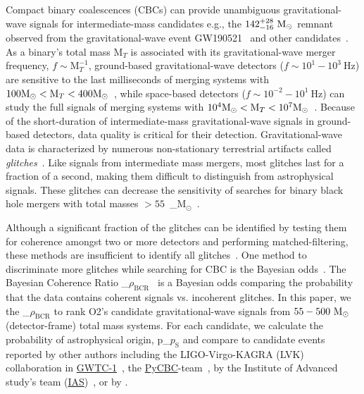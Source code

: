 \documentclass[%
 nofootinbib,
 amsmath,amssymb,
 aps,
 twocolumn,
 superscriptaddress
]{revtex4-2}
\newcommand{\pycbc}{{\sc \href{https://pycbc.org/}{{PyCBC}}}\xspace}
\newcommand{\GWTC}{{\sc \href{https://ui.adsabs.harvard.edu/abs/2019PhRvX...9c1040A/abstract}{{GWTC-1}}}\xspace}
\newcommand{\IAS}{{\sc \href{https://ui.adsabs.harvard.edu/abs/2020PhRvD.101h3030V/abstract}{{IAS}}}\xspace}
\newcommand{\fancytext}[1]{{\relax\ifmmode#1\else $#1$\fi}\xspace}
\newcommand{\mathcmd}[1]{{\sc \relax\ifmmode#1\else $#1$\fi}\xspace}
\newcommand{\bcr}{\mathcmd{\rho_\text{BCR}}}
\newcommand{\msun}{\mathcmd{\text{M}_\odot}}
\newcommand{\pastrobcr}{\fancytext{p_\text{S}}}
\begin{document}
Compact binary coalescences (CBCs) can provide unambiguous gravitational-wave signals for intermediate-mass candidates e.g., the $142^{+28}_{-16}\ \msun$ remnant observed from the gravitational-wave event GW190521~\cite{Abbott:2020:PhRvL} and other candidates~\cite{ligo_imbh_search, ligo_imbh_o3, pycbc_imbh}. As a binary's total mass $\text{M}_{T}$ is associated with its gravitational-wave merger frequency, $f\sim \text{M}_{T}^{-1}$,  ground-based gravitational-wave detectors ($f\sim 10^1 - 10^3\ \text{Hz}$) are sensitive to the last milliseconds of merging systems with $100 \msun < \text{M}_{T} < 400 \msun$~\cite{LIGOScientificCollaboration:2015:CQGra, Martynov:2016:PhRvD, Moore_2014}, while space-based detectors ($f \sim 10^{-2} - 10^1\ \text{Hz}$) can study the full signals of merging systems with $10^4 \msun < \text{M}_{T} < 10^7 \msun$~\cite{ Moore_2014, Lu:2019:PhRvD}. Because of the short-duration of intermediate-mass gravitational-wave signals in ground-based detectors, data quality is critical for their detection. Gravitational-wave data is characterized by numerous non-stationary terrestrial artifacts called \textit{glitches}~\cite{ pycbc_short_duration_transients, pe_with_glitch, blip_glitches}. Like signals from intermediate mass mergers, most glitches last for a fraction of a second, making them difficult to distinguish from astrophysical signals. These glitches can decrease the sensitivity of searches for binary black hole mergers with total masses $>55$~\msun ~\cite{pycbc_short_duration_transients}.

Although a significant fraction of the glitches can be identified by testing them for coherence amongst two or more detectors and performing matched-filtering, these methods are insufficient to identify all glitches~\cite{ pycbc_short_duration_transients, pe_with_glitch, blip_glitches}. One method to discriminate more glitches while searching for CBC is the Bayesian odds~\cite{bci, kanner2016leveraging, BCR1, BCR2, bcr_gw151216, bayesian_odds}. The Bayesian Coherence Ratio \bcr~\cite{BCR1,BCR2} is a Bayesian odds comparing the probability that the data contains coherent signals vs. incoherent glitches. In this paper, we the \bcr to rank O2's candidate gravitational-wave signals from $55-500\ \msun$ (detector-frame) total mass systems. For each candidate, we calculate the probability of astrophysical origin, \pastrobcr and compare to candidate events reported by other authors including the LIGO-Virgo-KAGRA (LVK) collaboration in \GWTC~\cite{GWTC1}, the \pycbc-team~\cite{pycbc_code, pycbc_og0, pycbc_og1, pycbc_og2, pycbc_og3, pycbc_og4, pycbc_og5, pycbc_og6, pycbc_single_det, pycbc_ogc_2}, by the Institute of Advanced study's team (\IAS)~\cite{IAS0, IAS1, IAS2}, or by \citet{bayesian_odds}. 
\end{document}
